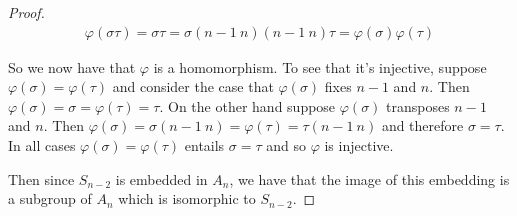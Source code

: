 \documentclass{exam}
\begin{document}
\begin{questions}
\begin{proof}
  \begin{align*}
    \varphi(\sigma\tau) = \sigma\tau = \sigma(n-1\ n)(n-1\ n)\tau = \varphi(\sigma)\varphi(\tau)
  \end{align*}

  So we now have that $\varphi$ is a homomorphism.  To see that it's injective, suppose $\varphi(\sigma)=\varphi(\tau)$ and consider the case that $\varphi(\sigma)$ fixes $n-1$ and $n$.  Then $\varphi(\sigma) = \sigma = \varphi(\tau)=\tau$.  On the other hand suppose $\varphi(\sigma)$ transposes $n-1$ and $n$.  Then $\varphi(\sigma) = \sigma(n-1\ n) = \varphi(\tau) = \tau(n-1\ n)$ and therefore $\sigma=\tau$.  In all cases $\varphi(\sigma)=\varphi(\tau)$ entails $\sigma=\tau$ and so $\varphi$ is injective.

  Then since $S_{n-2}$ is embedded in $A_n$, we have that the image of this embedding is a subgroup of $A_n$ which is isomorphic to $S_{n-2}$.
\end{proof}


\end{questions}
\end{document}
